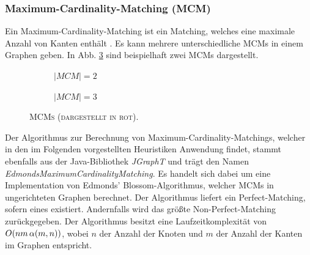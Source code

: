 \subsubsection{Maximum-Cardinality-Matching (MCM)}
\label{sec:digression_mcm}

Ein Maximum-Cardinality-Matching ist ein Matching, welches eine maximale Anzahl von Kanten enthält \cite{Gibbons1985}.
Es kann mehrere unterschiedliche MCMs in einem Graphen geben.
In Abb. \ref{fig:mcm_examples} sind beispielhaft zwei MCMs dargestellt.
\begin{figure}[H]
  \begin{subfigure}[b]{0.4\textwidth}
  \centering
  \caption{\textsc{$|MCM| = 2$}}
  \label{fig:mcm1}
  \end{subfigure}
  \hfill
  \begin{subfigure}[b]{0.4\textwidth}
  \centering
    \caption{\textsc{$|MCM| = 3$}}
    \label{fig:mcm_2}
  \end{subfigure}
  \caption{\textsc{MCMs (dargestellt in rot).}}
  \label{fig:mcm_examples}
\end{figure}

Der Algorithmus zur Berechnung von Maximum-Cardinality-Matchings, welcher in den im Folgenden
vorgestellten Heuristiken Anwendung findet, stammt ebenfalls aus der Java-Bibliothek \textit{JGraphT} \cite{JGraphT} und trägt
den Namen \textit{EdmondsMaximumCardinalityMatching}. Es handelt sich dabei um eine Implementation von Edmonds' Blossom-Algorithmus,
welcher MCMs in ungerichteten Graphen berechnet. Der Algorithmus liefert ein Perfect-Matching, sofern eines existiert.
Andernfalls wird das größte Non-Perfect-Matching zurückgegeben.
Der Algorithmus besitzt eine Laufzeitkomplexität von $O(nm \thinspace \alpha(m, n))$, wobei $n$ der Anzahl der Knoten
und $m$ der Anzahl der Kanten im Graphen entspricht.

